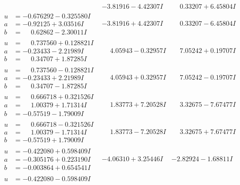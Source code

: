 \documentclass[1p]{elsarticle_modified}
\theoremstyle{definition}
\begin{document}
$$\begin{array}{c|c|c}
 & -3.81916 - 4.42307 I & \phantom{-}0.33207 + 6.45804 I \\ \hline\begin{aligned}
u &= -0.676292 - 0.325580 I \\
a &= -0.92125 + 3.03516 I \\
b &= \phantom{-}0.62862 - 2.30011 I\end{aligned}
 & -3.81916 + 4.42307 I & \phantom{-}0.33207 - 6.45804 I \\ \hline\begin{aligned}
u &= \phantom{-}0.737560 + 0.128821 I \\
a &= -0.23433 - 2.21989 I \\
b &= \phantom{-}0.34707 + 1.87285 I\end{aligned}
 & \phantom{-}4.05943 - 0.32957 I & \phantom{-}7.05242 + 0.19707 I \\ \hline\begin{aligned}
u &= \phantom{-}0.737560 - 0.128821 I \\
a &= -0.23433 + 2.21989 I \\
b &= \phantom{-}0.34707 - 1.87285 I\end{aligned}
 & \phantom{-}4.05943 + 0.32957 I & \phantom{-}7.05242 - 0.19707 I \\ \hline\begin{aligned}
u &= \phantom{-}0.666718 + 0.321526 I \\
a &= \phantom{-}1.00379 + 1.71314 I \\
b &= -0.57519 - 1.79009 I\end{aligned}
 & \phantom{-}1.83773 + 7.20528 I & \phantom{-}3.32675 - 7.67477 I \\ \hline\begin{aligned}
u &= \phantom{-}0.666718 - 0.321526 I \\
a &= \phantom{-}1.00379 - 1.71314 I \\
b &= -0.57519 + 1.79009 I\end{aligned}
 & \phantom{-}1.83773 - 7.20528 I & \phantom{-}3.32675 + 7.67477 I \\ \hline\begin{aligned}
u &= -0.422080 + 0.598409 I \\
a &= -0.305176 + 0.223190 I \\
b &= -0.003864 + 0.654541 I\end{aligned}
 & -4.06310 + 3.25446 I & -2.82924 - 1.68811 I \\ \hline\begin{aligned}
u &= -0.422080 - 0.598409 I \\

\end{aligned}
\end{array}$$
\end{document}
